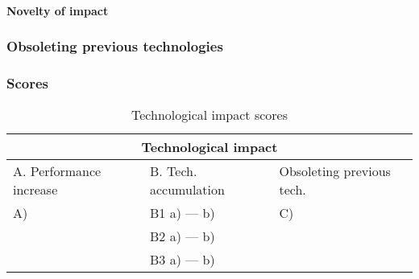 \paragraph{Novelty of impact}

\subsubsection{Obsoleting previous technologies}

\subsubsection{Scores}
\begin{table}[h]
\centering
\begin{tabular}{l l l}
\hline
\multicolumn{3}{|c|}{Technological impact} \\
\hline
A. Performance increase & B. Tech. accumulation & Obsoleting previous tech.\\
A)   & B1 a)  --- b)  & C) \\ 
     & B2 a)  --- b)  & \\
     & B3 a)  --- b)  & \\
\hline
\end{tabular}
\caption{Technological impact scores}
\label{tbl:impactscores5}
\end{table}